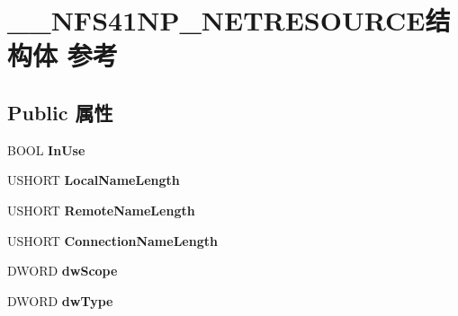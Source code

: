 \hypertarget{struct_____n_f_s41_n_p___n_e_t_r_e_s_o_u_r_c_e}{}\section{\+\_\+\+\_\+\+N\+F\+S41\+N\+P\+\_\+\+N\+E\+T\+R\+E\+S\+O\+U\+R\+C\+E结构体 参考}
\label{struct_____n_f_s41_n_p___n_e_t_r_e_s_o_u_r_c_e}
\subsection*{Public 属性}
\begin{DoxyCompactItemize}
\item 
\mbox{\label{struct_____n_f_s41_n_p___n_e_t_r_e_s_o_u_r_c_e_a80085c2bbbd49eded15fbc796aee862c}} 
B\+O\+OL {\bfseries In\+Use}
\item 
\mbox{\label{struct_____n_f_s41_n_p___n_e_t_r_e_s_o_u_r_c_e_a4748dd05c03e18b386460a99ca00ad09}} 
U\+S\+H\+O\+RT {\bfseries Local\+Name\+Length}
\item 
\mbox{\label{struct_____n_f_s41_n_p___n_e_t_r_e_s_o_u_r_c_e_a75bf843ed771b176d81b134373350c58}} 
U\+S\+H\+O\+RT {\bfseries Remote\+Name\+Length}
\item 
\mbox{\label{struct_____n_f_s41_n_p___n_e_t_r_e_s_o_u_r_c_e_ae8a972a07046741afb2f8045e3331d4d}} 
U\+S\+H\+O\+RT {\bfseries Connection\+Name\+Length}
\item 
\mbox{\label{struct_____n_f_s41_n_p___n_e_t_r_e_s_o_u_r_c_e_aecd08e1bf86b8d3368cbf578fbce05e5}} 
D\+W\+O\+RD {\bfseries dw\+Scope}
\item 
\mbox{\label{struct_____n_f_s41_n_p___n_e_t_r_e_s_o_u_r_c_e_af0576be61c4b2cc30d1db50b8e19316b}} 
D\+W\+O\+RD {\bfseries dw\+Type}
\item 
\mbox{\label{struct_____n_f_s41_n_p___n_e_t_r_e_s_o_u_r_c_e_a11d9aae30d76577be586fe3d0e4f5406}} 

\end{DoxyCompactItemize}
